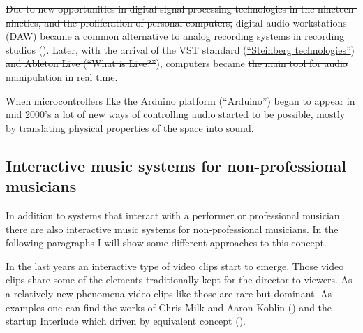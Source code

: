  \st{Due to new opportunities in digital signal processing technologies in the nineteen-nineties, and the proliferation of personal computers,} digital audio workstations (DAW) became a common alternative to analog recording  \st{systems} in \st{recording} studios (). Later, with the arrival of the VST standard (\href{http://www.steinberg.net/en/company/technologies.html}{``Steinberg technologies''}) \st{and Ableton Live (}\href{https://www.ableton.com/en/live/}{\st{``What is Live?''}}), computers became  \st{the main tool for audio manipulation in real time.} \href{https://www.ableton.com/en/live/}{}

\st{When microcontrollers like the Arduino platform (``Arduino'') began to appear in mid 2000's} a lot of new ways of controlling audio started to be possible, mostly by translating physical properties of the space into sound.

\subsection{Interactive music systems for non-professional musicians}

In addition to systems that interact with a performer or professional musician there are also interactive music systems for non-professional musicians. In the following paragraphs I will show some different approaches to this concept.

In the last years an interactive type of video clips start to emerge. Those video clips share some of the elements traditionally kept for the director to viewers. As a relatively new phenomena video clips like those are rare but dominant. As examples one can find the works of Chris Milk and Aaron Koblin () and the startup Interlude which driven by equivalent concept ().

